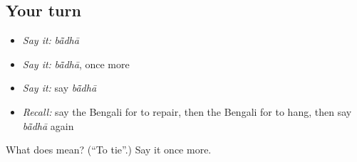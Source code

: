 \subsection*{Your turn}
\begin{itemize}
\raggedright
  \item \emph{Say it:} \emph{bā̃dhā}
  \item \emph{Say it:} \emph{bā̃dhā}, once more
  \item \emph{Say it:} say \emph{bā̃dhā}
  \item \emph{Recall:} say the Bengali for to repair, then the Bengali for to hang, then say \emph{bā̃dhā} again
\end{itemize}

\begin{tcolorbox}[breakable,colback=teal!4,colframe=teal!35!black,title={Before you move on}]
What does  mean? (\textquotedblleft{}To tie\textquotedblright{}.) Say it once more.
\end{tcolorbox}
